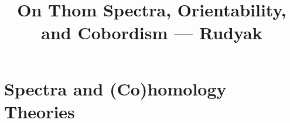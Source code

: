 \documentclass[11pt]{article}
\title{On Thom Spectra, Orientability, and Cobordism\small{ --- Rudyak}}
\author{}
\date{}
\begin{document}
\section{Spectra and (Co)homology Theories}
\end{document}
